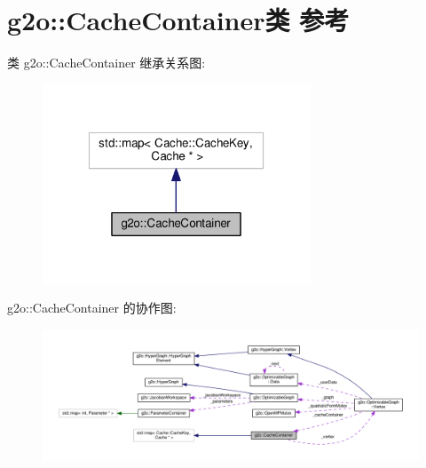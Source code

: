 \hypertarget{classg2o_1_1CacheContainer}{\section{g2o\-:\-:Cache\-Container类 参考}
\label{classg2o_1_1CacheContainer}
}


类 g2o\-:\-:Cache\-Container 继承关系图\-:
\nopagebreak
\begin{figure}[H]
\begin{center}
\leavevmode
\includegraphics[width=226pt]{classg2o_1_1CacheContainer__inherit__graph}
\end{center}
\end{figure}


g2o\-:\-:Cache\-Container 的协作图\-:
\nopagebreak
\begin{figure}[H]
\begin{center}
\leavevmode
\includegraphics[width=350pt]{classg2o_1_1CacheContainer__coll__graph}
\end{center}
\end{figure}
